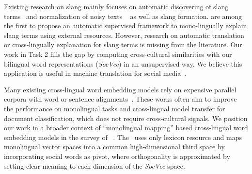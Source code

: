 Existing research on slang mainly focuses on automatic 
discovering of slang terms~\cite{elsahar2014a} and normalization of noisy texts ~\cite{han2012automatically} as well as slang formation. 
\citet{ni2017learning} are among the first to propose an automatic 
supervised framework to mono-lingually explain slang terms using 
external resources.
However, research on automatic translation or cross-lingually explanation for slang terms is missing from the literature. 
Our work in Task 2 fills the gap by computing cross-cultural similarities 
with our bilingual word representations (\textit{SocVec}) in an 
unsupervised way.
We believe this application is useful in machine translation for social media~\cite{wangling:acl2013}.

Many existing cross-lingual word embedding models
rely on expensive parallel corpora with word or sentence 
alignments~\cite{klementiev2012inducing,kovcisky2014learning}.
These works often aim to improve the performance on monolingual tasks and cross-lingual model transfer for document classification, which does not require cross-cultural signals. 
We position our work in a broader context of ``monolingual mapping'' based cross-lingual word embedding models in the survey of ~\citet{DBLP:journals/corr/Ruder17}. 
The \socvec\ uses only lexicon resource and maps monolingual vector spaces into a common high-dimensional third space by incorporating social words as pivot, where orthogonality is 
approximated by setting clear meaning to each dimension 
of the \textit{SocVec} space.

